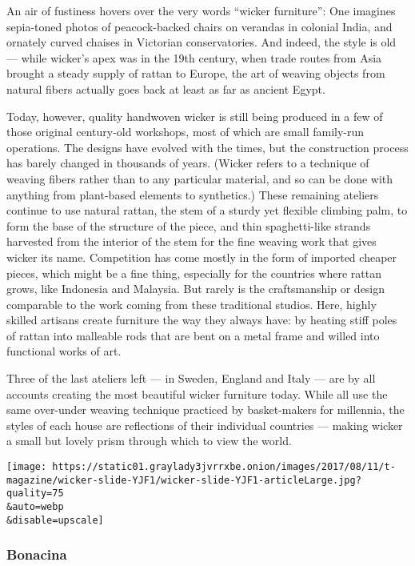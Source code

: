 An air of fustiness hovers over the very words ``wicker furniture'': One
imagines sepia-toned photos of peacock-backed chairs on verandas in
colonial India, and ornately curved chaises in Victorian conservatories.
And indeed, the style is old --- while wicker's apex was in the 19th
century, when trade routes from Asia brought a steady supply of rattan
to Europe, the art of weaving objects from natural fibers actually goes
back at least as far as ancient Egypt.

Today, however, quality handwoven wicker is still being produced in a
few of those original century-old workshops, most of which are small
family-run operations. The designs have evolved with the times, but the
construction process has barely changed in thousands of years. (Wicker
refers to a technique of weaving fibers rather than to any particular
material, and so can be done with anything from plant-based elements to
synthetics.) These remaining ateliers continue to use natural rattan,
the stem of a sturdy yet flexible climbing palm, to form the base of the
structure of the piece, and thin spaghetti-like strands harvested from
the interior of the stem for the fine weaving work that gives wicker its
name. Competition has come mostly in the form of imported cheaper
pieces, which might be a fine thing, especially for the countries where
rattan grows, like Indonesia and Malaysia. But rarely is the
craftsmanship or design comparable to the work coming from these
traditional studios. Here, highly skilled artisans create furniture the
way they always have: by heating stiff poles of rattan into malleable
rods that are bent on a metal frame and willed into functional works of
art.

Three of the last ateliers left --- in Sweden, England and Italy --- are
by all accounts creating the most beautiful wicker furniture today.
While all use the same over-under weaving technique practiced by
basket-makers for millennia, the styles of each house are reflections of
their individual countries --- making wicker a small but lovely prism
through which to view the world.

\texttt{[image: https://static01.graylady3jvrrxbe.onion/images/2017/08/11/t-magazine/wicker-slide-YJF1/wicker-slide-YJF1-articleLarge.jpg?quality=75\\\&auto=webp\\\&disable=upscale]}

\hypertarget{bonacina}{%
\subsubsection{Bonacina}\label{bonacina}}

